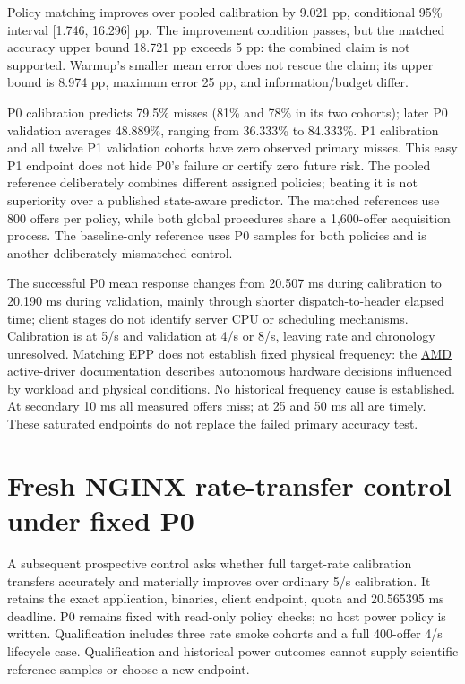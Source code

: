 \documentclass[11pt,a4paper]{article}
\begin{document}
Policy matching improves over pooled calibration by 9.021 pp, conditional
95\% interval [1.746, 16.296] pp. The improvement condition passes, but the
matched accuracy upper bound 18.721 pp exceeds 5 pp: the combined claim is
not supported. Warmup's smaller mean error does not rescue the claim; its
upper bound is 8.974 pp, maximum error 25 pp, and information/budget differ.

P0 calibration predicts 79.5\% misses (81\% and 78\% in its two cohorts); later
P0 validation averages 48.889\%, ranging from 36.333\% to 84.333\%. P1 calibration
and all twelve P1 validation cohorts have zero observed primary misses. This
easy P1 endpoint does not hide P0's failure or certify zero future risk.
The pooled reference deliberately combines different assigned policies;
beating it is not superiority over a published state-aware predictor. The
matched references use 800 offers per policy, while both global procedures
share a 1,600-offer acquisition process. The baseline-only reference uses P0
samples for both policies and is another deliberately mismatched control.

The successful P0 mean response changes from 20.507 ms during calibration to
20.190 ms during validation, mainly through shorter dispatch-to-header elapsed
time; client stages do not identify server CPU or scheduling mechanisms.
Calibration is at 5/s and validation at 4/s or 8/s, leaving rate and chronology
unresolved. Matching EPP does not establish fixed physical frequency: the
\href{https://docs.kernel.org/admin-guide/pm/amd-pstate.html}{AMD active-driver documentation} \cite{amdpstate}
describes autonomous hardware decisions influenced by workload and physical
conditions. No historical frequency cause is established. At secondary 10 ms
all measured offers miss; at 25 and 50 ms all are timely. These saturated
endpoints do not replace the failed primary accuracy test.

\section{Fresh NGINX rate-transfer control under fixed P0}

A subsequent prospective control asks whether full target-rate calibration
transfers accurately and materially improves over ordinary 5/s calibration.
It retains the exact application, binaries, client endpoint, quota and
20.565395 ms deadline. P0 remains fixed with read-only policy checks; no host
power policy is written. Qualification includes three rate smoke cohorts and
a full 400-offer 4/s lifecycle case. Qualification and historical power outcomes
cannot supply scientific reference samples or choose a new endpoint.
\end{document}
